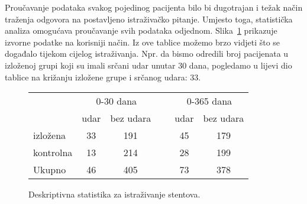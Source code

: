 Proučavanje podataka svakog pojedinog pacijenta bilo bi dugotrajan i težak način traženja odgovora na postavljeno istraživačko pitanje. Umjesto toga, statistička analiza omogućava proučavanje svih podataka odjednom. Slika~\ref{stentStudyResults} prikazuje izvorne podatke na korisniji način. Iz ove tablice možemo brzo vidjeti što se događalo tijekom cijelog istraživanja. Npr. da bismo odredili broj pacijenata u izloženoj grupi koji su imali srčani udar unutar 30 dana, pogledamo u lijevi dio tablice na križanju izložene grupe i srčanog udara: 33.


\begin{figure}[h]
	\centering
	\begin{tabular}{l cc c cc}
		& \multicolumn{2}{c}{0-30 dana} &\hspace{5mm}\ & \multicolumn{2}{c}{0-365 dana} \\
		\cline{2-3} \cline{5-6}
		& 	udar 	& bez udara && 	udar 	& bez udara \\
		\hline
		izložena 	& 33		& 191	&&	45 	& 179 \\
		kontrolna 	& 13		& 214	&& 	28	& 199 \\
		\hline
		Ukupno		& 46		& 405	&&	73	& 378 \\
		\hline
	\end{tabular}
	\caption{Deskriptivna statistika za istraživanje stentova.}
	\label{stentStudyResults}
\end{figure}


